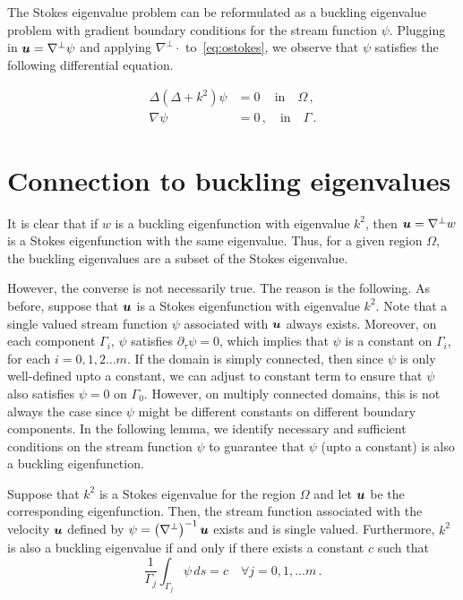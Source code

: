 The Stokes eigenvalue problem can be reformulated as a buckling
eigenvalue problem with gradient boundary conditions for
the stream function $\psi$.
Plugging in ${\boldsymbol u} = \nabla^{\perp} \psi$ and applying $\nabla^{\perp} \cdot$
to~\cref{eq:ostokes}, we observe that $\psi$ satisfies the following 
differential equation.

\begin{equation}
\begin{aligned}
\Delta (\Delta + k^2) \psi &= 0 \, \quad \textrm{in} \quad \Omega \, , \\
\nabla \psi &=0 \, ,\quad \textrm{in} \quad \Gamma \, .
\end{aligned}
\end{equation}

\section{Connection to buckling eigenvalues}
It is clear that if $w$ is a buckling eigenfunction with
eigenvalue $k^2$, then ${\boldsymbol u} = \nabla^{\perp} w$ is a Stokes eigenfunction
with the same eigenvalue. 
Thus, for a given region $\Omega$,
the buckling eigenvalues are a subset of the Stokes eigenvalue. 

However, the converse is not necessarily true. 
The reason is the following.
As before, suppose that ${\boldsymbol u}$ is a Stokes eigenfunction
with eigenvalue $k^2$.
Note that a single valued stream function $\psi$ associated with
${\boldsymbol u}$ always exists. 
Moreover, on each component $\Gamma_{i}$, 
$\psi$ satisfies $\partial_{\tau} \psi = 0$, which implies that
$\psi$ is a constant on $\Gamma_{i}$, for each $i=0,1,2\ldots m$.
If the domain is simply connected, then since $\psi$ is only
well-defined upto a constant, we can adjust to constant term 
to ensure that $\psi$ also satisfies $\psi = 0$ on $\Gamma_{0}$.
However, on multiply connected domains, this is not always 
the case since $\psi$ might be different constants on different
boundary components. 
In the following lemma, we identify necessary and sufficient 
conditions on the stream function $\psi$ to guarantee that
$\psi$ (upto a constant) is also a buckling eigenfunction.

\begin{lem}
\label{lem:mainlem}
Suppose that $k^2$ is a Stokes eigenvalue for the region $\Omega$ and 
let ${\boldsymbol u}$ be the corresponding eigenfunction. 
Then, the stream function associated with the velocity ${\boldsymbol u}$ defined by
$\psi = \left(\nabla^{\perp} \right)^{-1} {\boldsymbol u}$ exists and is single valued. 
Furthermore, $k^2$ is also a buckling eigenvalue if and only if
there exists a constant $c$ such that
\begin{equation}
\frac{1}{\Gamma_{j}}\int_{\Gamma_{j}} \psi\, ds = c \quad \forall j=0,1,\ldots m \, .
\end{equation}
\end{lem}

